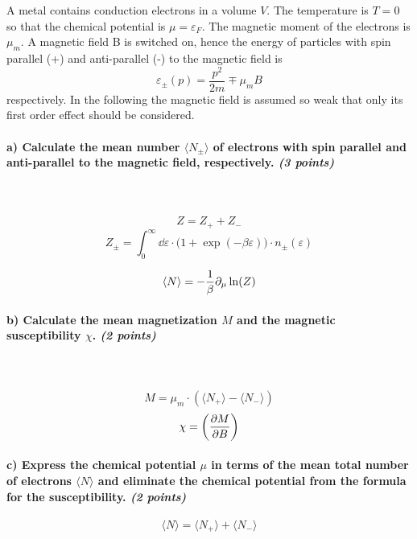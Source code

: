 A metal contains conduction electrons in a volume $V$. 
The temperature is $T=0$ so that the chemical potential is 
$\mu=\varepsilon_F$. The magnetic moment of the electrons 
is $\mu_m$. A magnetic field B is switched on, hence the 
energy of particles with spin parallel (+) and anti-parallel 
(-) to the magnetic field is
\begin{equation}
    \varepsilon_\pm(p)=\frac{p^2}{2m}\mp\mu_mB
\end{equation}
respectively. In the following the magnetic field is assumed 
so weak that only its first order effect should be considered.

\paragraph{a) Calculate the mean number $\langle N_\pm\rangle$ 
    of electrons with spin parallel and anti-parallel to the 
    magnetic field, respectively. \textit{(3 points)}
} \ \\
    \\
    \begin{equation}
        Z=Z_++Z_-
    \end{equation}
    \begin{equation}
        Z_\pm=
        \int_0^{\infty}\dd\varepsilon\cdot\bigg(
            1+\exp(-\beta\varepsilon)
        \bigg)\cdot n_\pm(\varepsilon)
    \end{equation}


    \begin{equation}
        \langle N \rangle
        =-\frac{1}{\beta}\partial_\mu\ln(Z)
    \end{equation}


\paragraph{b) Calculate the mean magnetization $M$ and the magnetic 
    susceptibility $\chi$. \textit{(2 points)}
} \ \\
    \\
    \begin{equation}
        M=\mu_m\cdot(\langle N_+\rangle - \langle N_-\rangle)
    \end{equation}
    \begin{equation}
        \chi=\bigg(\frac{\partial M}{\partial B}\bigg)
    \end{equation}


\paragraph{c) Express the chemical potential $\mu$ in terms of the 
    mean total number of electrons $\langle N\rangle$ and 
    eliminate the chemical potential from the formula 
    for the susceptibility. \textit{(2 points)}
}
    \begin{equation}
        \langle N\rangle
        =\langle N_+\rangle+\langle N_-\rangle
    \end{equation}
